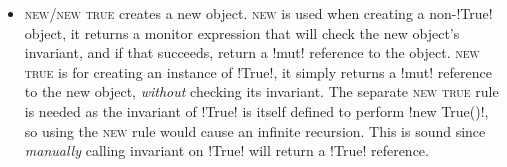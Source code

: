 \begin{itemize}
\item \textsc{new/new true} creates a new object.
\textsc{new} is used when creating a non-\Q!True! object, it returns a monitor expression that will check the new object's invariant, and if that succeeds, return a \Q!mut! reference to the object.
\textsc{new true} is for creating an instance of \Q!True!, 
	it simply returns a \Q!mut! reference to the new object, \emph{without} checking its invariant.
	The separate \textsc{new true} rule is needed as the invariant of \Q!True! is itself defined to perform \Q!new True()!, so using the \textsc{new} rule would cause an infinite recursion.
	This is sound since \emph{manually} calling invariant on \Q!True! will return a \Q!True! reference.


\end{itemize}
